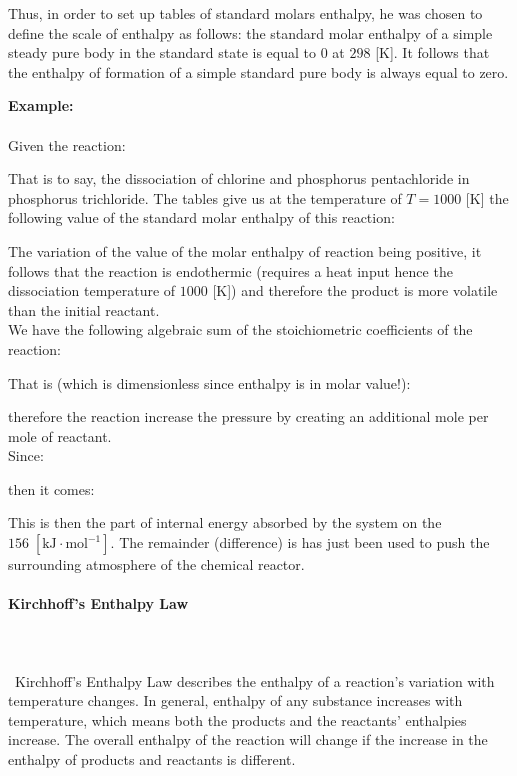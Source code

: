 	Thus, in order to set up tables of standard molars enthalpy, he was chosen to define the scale of enthalpy as follows: the standard molar enthalpy of a simple steady pure body in the standard state is equal to $0$ at $298$ [K]. It follows that the enthalpy of formation of a simple standard pure body is always equal to zero.
	\begin{tcolorbox}[colframe=black,colback=white,sharp corners,breakable]
	\textbf{{\Large {}}Example:}\\\\
	Given the reaction:
	
	That is to say, the dissociation of chlorine and phosphorus pentachloride in phosphorus trichloride. The tables give us at the temperature of $T=1000$ [K] the following value of the standard molar enthalpy of this reaction:
	
	The variation of the value of the molar enthalpy of reaction being positive, it follows that the reaction is endothermic (requires a heat input hence the dissociation temperature of $1000$ [K]) and therefore the product is more volatile than the initial reactant.\\

	We have the following algebraic sum of the stoichiometric coefficients of the reaction:
	
	That is (which is dimensionless since enthalpy is in molar value!):
	
	therefore the reaction increase the pressure by creating an additional mole per mole of reactant.\\

	Since:
	
	then it comes:
	
	This is then the part of internal energy absorbed by the system on the $156 \;[\text{kJ}\cdot \text{mol}^{-1}]$. The remainder (difference) is has just been used to push the surrounding atmosphere of the chemical reactor.
	\end{tcolorbox}
	
	\paragraph{Kirchhoff's Enthalpy Law}\mbox{}\\\\\
	Kirchhoff's Enthalpy Law describes the enthalpy of a reaction's variation with temperature changes. In general, enthalpy of any substance increases with temperature, which means both the products and the reactants' enthalpies increase. The overall enthalpy of the reaction will change if the increase in the enthalpy of products and reactants is different.
	
